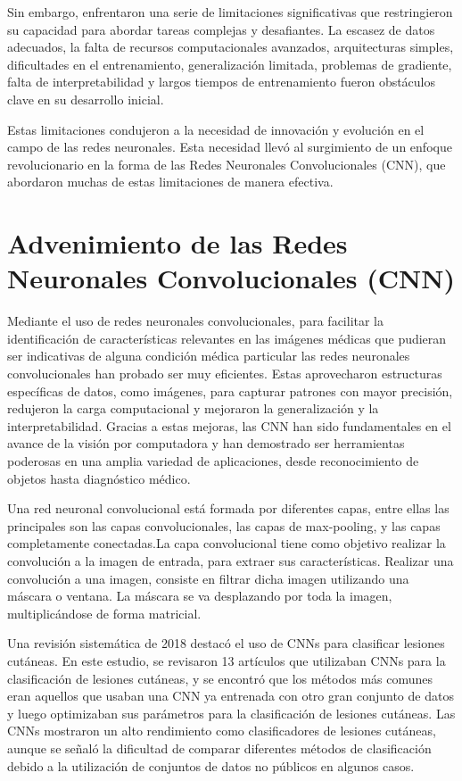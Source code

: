 Sin embargo, enfrentaron una serie de limitaciones significativas que restringieron su capacidad para abordar tareas complejas y desafiantes. La escasez de datos adecuados, la falta de recursos computacionales avanzados, arquitecturas simples, dificultades en el entrenamiento, generalización limitada, problemas de gradiente, falta de interpretabilidad y largos tiempos de entrenamiento fueron obstáculos clave en su desarrollo inicial.



Estas limitaciones condujeron a la necesidad de innovación y evolución en el campo de las redes neuronales. Esta necesidad llevó al surgimiento de un enfoque revolucionario en la forma de las Redes Neuronales Convolucionales (CNN), que abordaron muchas de estas limitaciones de manera efectiva.

\section*{Advenimiento de las Redes Neuronales Convolucionales (CNN)}   

Mediante el uso de redes neuronales convolucionales, para facilitar la identificación de características relevantes en las imágenes médicas que pudieran ser indicativas de alguna condición médica particular las redes neuronales convolucionales han probado ser muy eficientes. Estas aprovecharon estructuras específicas de datos, como imágenes, para capturar patrones con mayor precisión, redujeron la carga computacional y mejoraron la generalización y la interpretabilidad. Gracias a estas mejoras, las CNN han sido fundamentales en el avance de la visión por computadora y han demostrado ser herramientas poderosas en una amplia variedad de aplicaciones, desde reconocimiento de objetos hasta diagnóstico médico. 

Una red neuronal convolucional está formada por diferentes capas, entre ellas las principales son las capas convolucionales, las capas de max-pooling, y las capas completamente conectadas.La capa convolucional tiene como objetivo realizar la convolución a la imagen de entrada, para extraer sus características. Realizar una convolución a una imagen, consiste en filtrar dicha imagen utilizando una máscara o ventana. La máscara se va desplazando por toda la imagen, multiplicándose de forma matricial. %

Una revisión sistemática de 2018 destacó el uso de CNNs para clasificar lesiones cutáneas. En este estudio, se revisaron 13 artículos que utilizaban CNNs para la clasificación de lesiones cutáneas, y se encontró que los métodos más comunes eran aquellos que usaban una CNN ya entrenada con otro gran conjunto de datos y luego optimizaban sus parámetros para la clasificación de lesiones cutáneas. Las CNNs mostraron un alto rendimiento como clasificadores de lesiones cutáneas, aunque se señaló la dificultad de comparar diferentes métodos de clasificación debido a la utilización de conjuntos de datos no públicos en algunos casos. %

